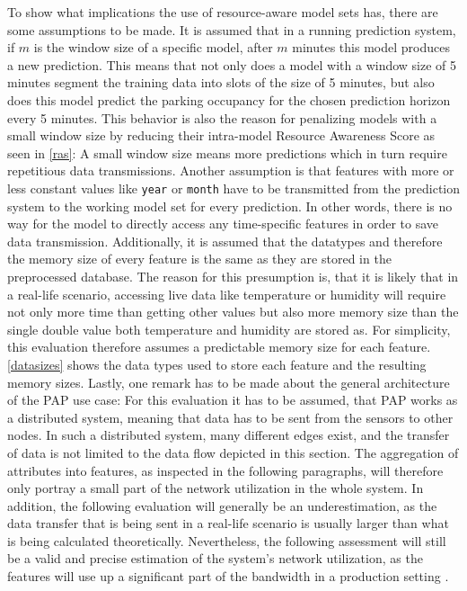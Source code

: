 To show what implications the use of resource-aware model sets has, there are some assumptions to be made. It is assumed that in a running prediction system, if $m$ is the window size of a specific model, after $m$ minutes this model produces a new prediction. This means that not only does a model with a window size of 5 minutes segment the training data into slots of the size of 5 minutes, but also does this model predict the parking occupancy for the chosen prediction horizon every 5 minutes. This behavior is also the reason for penalizing models with a small window size by reducing their intra-model Resource Awareness Score as seen in \autoref{ras}: A small window size means more predictions which in turn require repetitious data transmissions. Another assumption is that features with more or less constant values like \texttt{year} or \texttt{month} have to be transmitted from the prediction system to the working model set for every prediction. In other words, there is no way for the model to directly access any time-specific features in order to save data transmission. Additionally, it is assumed that the datatypes and therefore the memory size of every feature is the same as they are stored in the preprocessed database. The reason for this presumption is, that it is likely that in a real-life scenario, accessing live data like temperature or humidity will require not only more time than getting other values but also more memory size than the single double value both temperature and humidity are stored as. For simplicity, this evaluation therefore assumes a predictable memory size for each feature. \autoref{datasizes} shows the data types used to store each feature and the resulting memory sizes. Lastly, one remark has to be made about the general architecture of the PAP use case: For this evaluation it has to be assumed, that PAP works as a distributed system, meaning that data has to be sent from the sensors to other nodes. In such a distributed system, many different edges exist, and the transfer of data is not limited to the data flow depicted in this section. The aggregation of attributes into features, as inspected in the following paragraphs, will therefore only portray a small part of the network utilization in the whole system. In addition, the following evaluation will generally be an underestimation, as the data transfer that is being sent in a real-life scenario is usually larger than what is being calculated theoretically. Nevertheless, the following assessment will still be a valid and precise estimation of the system's network utilization, as the features will use up a significant part of the bandwidth in a production setting \cite{sunkel2022}.



